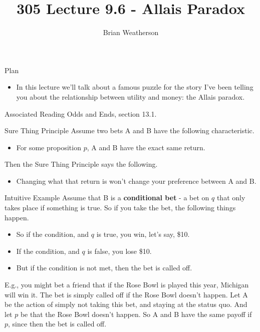 \documentclass[
  ignorenonframetext,
]{beamer}
\title{305 Lecture 9.6 - Allais Paradox}
\author{Brian Weatherson}
\date{}
\providecommand{\tightlist}{%
  \setlength{\itemsep}{0pt}\setlength{\parskip}{0pt}}
\renewcommand{\,}{\text{, }}
\begin{document}
\frame{\titlepage}

\begin{frame}{Plan}
\protect\hypertarget{plan}{}
\begin{itemize}
\tightlist
\item
  In this lecture we'll talk about a famous puzzle for the story I've
  been telling you about the relationship between utility and money: the
  Allais paradox.
\end{itemize}
\end{frame}

\begin{frame}{Associated Reading}
\protect\hypertarget{associated-reading}{}
Odds and Ends, section 13.1.
\end{frame}

\begin{frame}{Sure Thing Principle}
\protect\hypertarget{sure-thing-principle}{}
Assume two bets A and B have the following characteristic.

\begin{itemize}
\tightlist
\item
  For some proposition \(p\), A and B have the exact same return. \pause
\end{itemize}

Then the Sure Thing Principle says the following.

\begin{itemize}
\tightlist
\item
  Changing what that return is won't change your preference between A
  and B.
\end{itemize}
\end{frame}

\begin{frame}{Intuitive Example}
\protect\hypertarget{intuitive-example}{}
Assume that B is a \textbf{conditional bet} - a bet on \(q\) that only
takes place if something is true. So if you take the bet, the following
things happen.

\begin{itemize}
\tightlist
\item
  So if the condition, and \(q\) is true, you win, let's say, \$10.
\item
  If the condition, and \(q\) is false, you lose \$10.
\item
  But if the condition is not met, then the bet is called off.
\end{itemize}

E.g., you might bet a friend that if the Rose Bowl is played this year,
Michigan will win it. The bet is simply called off if the Rose Bowl
doesn't happen. Let A be the action of simply not taking this bet, and
staying at the status quo. And let \(p\) be that the Rose Bowl doesn't
happen. So A and B have the same payoff if \(p\), since then the bet is
called off.
\end{frame}
\end{document}
